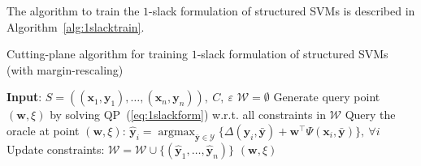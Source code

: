 \documentclass[9pt]{extarticle}
\DeclareMathOperator*{\argmax}{argmax}
\begin{document}
The algorithm to train the $1$-slack formulation of structured SVMs is described in Algorithm~\ref{alg:1slacktrain}.

\begin{algorithm}[htbp]
\caption{Cutting-plane algorithm for training $1$-slack formulation of structured SVMs (with margin-rescaling)}
\label{alg:1slacktrain}
\begin{algorithmic}[1]
\STATE \textbf{Input}: $S = \left( (\mathbf{x}_1, \mathbf{y}_1), \dots, (\mathbf{x}_n, \mathbf{y}_n) \right),~ C,~ \varepsilon$
\STATE $\mathcal{W} = \emptyset$
\REPEAT
    \STATE Generate query point $(\mathbf{w}, \xi)$ by solving QP~(\ref{eq:1slackform}) w.r.t. all constraints in $\mathcal{W}$
    \STATE Query the oracle at point $(\mathbf{w}, \xi)$: $\hat{\mathbf{y}}_i = \argmax_{\bar{\mathbf{y}} \in \mathcal{Y}} \{ \Delta(\mathbf{y}_i, \bar{\mathbf{y}}) + 
           \mathbf{w}^\top \Psi(\mathbf{x}_i, \bar{\mathbf{y}}) \},~ \forall i$
    \STATE Update constraints: $\mathcal{W} = \mathcal{W} \cup \{ (\hat{\mathbf{y}}_1, \dots, \hat{\mathbf{y}}_n) \}$
\RETURN $(\mathbf{w}, \xi)$
\end{algorithmic}
\end{algorithm}
\end{document}
